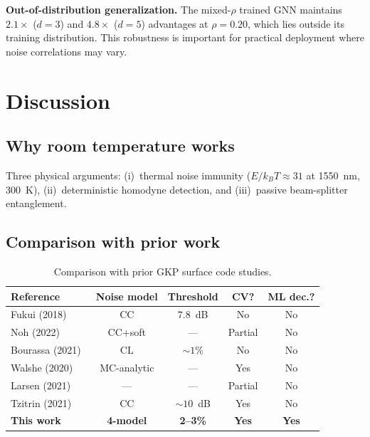\documentclass[twocolumn,showpacs,preprintnumbers,amsmath,amssymb,superscriptaddress]{revtex4-2}
\begin{document}
\textbf{Out-of-distribution generalization.} The mixed-$\rho$ trained GNN maintains $2.1\times$ ($d = 3$) and $4.8\times$ ($d = 5$) advantages at $\rho = 0.20$, which lies outside its training distribution. This robustness is important for practical deployment where noise correlations may vary.

\section{Discussion}
\label{sec:discussion}

\subsection{Why room temperature works}

Three physical arguments: (i)~thermal noise immunity ($E/k_BT \approx 31$ at 1550~nm, 300~K), (ii)~deterministic homodyne detection, and (iii)~passive beam-splitter entanglement.

\subsection{Comparison with prior work}

\begin{table}[h]
\caption{Comparison with prior GKP surface code studies.}
\label{tab:prior_work}
\begin{ruledtabular}
\begin{tabular}{lcccc}
Reference & Noise model & Threshold & CV? & ML dec.? \\
\hline
Fukui (2018)~\cite{fukui2018} & CC & $7.8$~dB & No & No \\
Noh (2022)~\cite{noh2022} & CC+soft & --- & Partial & No \\
Bourassa (2021)~\cite{bourassa2021} & CL & $\sim 1\%$ & No & No \\
Walshe (2020)~\cite{walshe2020} & MC-analytic & --- & Yes & No \\
Larsen (2021)~\cite{larsen2021} & --- & --- & Partial & No \\
Tzitrin (2021)~\cite{tzitrin2021} & CC & $\sim 10$~dB & Yes & No \\
\textbf{This work} & \textbf{4-model} & \textbf{2--3\%} & \textbf{Yes} & \textbf{Yes} \\
\end{tabular}
\end{ruledtabular}
\end{table}
\end{document}
